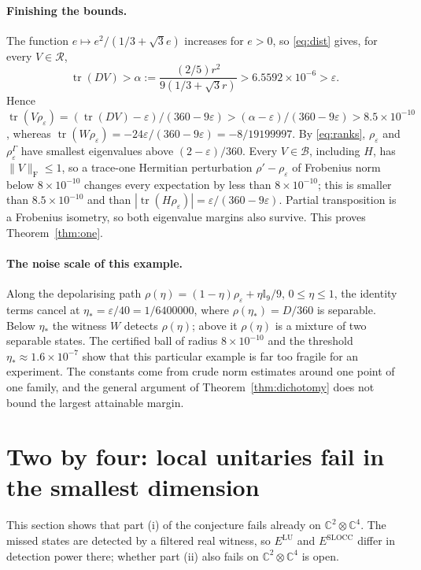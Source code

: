 \documentclass[11pt,a4paper]{article}
\theoremstyle{definition}\newtheorem{definition}[theorem]{Definition}\newtheorem*{conj}{Conjecture 9 of Shen, Chen and Bian}\newtheorem{remark}[theorem]{Remark}
\newcommand{\tr}{\operatorname{tr}}\newcommand{\im}{\operatorname{Im}}\newcommand{\adj}{\operatorname{adj}}\newcommand{\id}{\mathbb I}
\newcommand{\eps}{\varepsilon}\newcommand{\ket}[1]{\lvert #1\rangle}\newcommand{\bra}[1]{\langle #1\rvert}\newcommand{\F}{\mathrm F}\newcommand{\op}{\mathrm{op}}\newcommand{\C}{\mathbb C}
\newcommand{\cB}{\mathcal B}\newcommand{\cR}{\mathcal R}\newcommand{\vecm}{\mathrm{vec}}
\begin{document}
\paragraph{Finishing the bounds.}
The function $e\mapsto e^2/(1/3+\sqrt3 e)$ increases for $e>0$, so \eqref{eq:dist} gives, for every $V\in\cR$,
\[
 \tr(DV)>\alpha:=\frac{(2/5)r^2}{9(1/3+\sqrt3 r)}
 >6.5592\times10^{-6}>\eps .
\]
Hence $\tr(V\rho_\eps)=(\tr(DV)-\eps)/(360-9\eps)>(\alpha-\eps)/(360-9\eps)>8.5\times10^{-10}$, whereas $\tr(W\rho_\eps)=-24\eps/(360-9\eps)=-8/19199997$. By \eqref{eq:ranks}, $\rho_\eps$ and $\rho_\eps^\Gamma$ have smallest eigenvalues above $(2-\eps)/360$. Every $V\in\cB$, including $H$, has $\|V\|_\F\leq1$, so a trace-one Hermitian perturbation $\rho'-\rho_\eps$ of Frobenius norm below $8\times10^{-10}$ changes every expectation by less than $8\times10^{-10}$; this is smaller than $8.5\times10^{-10}$ and than $|\tr(H\rho_\eps)|=\eps/(360-9\eps)$. Partial transposition is a Frobenius isometry, so both eigenvalue margins also survive. This proves Theorem~\ref{thm:one}.

\paragraph{The noise scale of this example.}
Along the depolarising path $\rho(\eta)=(1-\eta)\rho_\eps+\eta\id_9/9$, $0\leq\eta\leq1$, the identity terms cancel at $\eta_*=\eps/40=1/6400000$, where $\rho(\eta_*)=D/360$ is separable. Below $\eta_*$ the witness $W$ detects $\rho(\eta)$; above it $\rho(\eta)$ is a mixture of two separable states. The certified ball of radius $8\times10^{-10}$ and the threshold $\eta_*\approx1.6\times10^{-7}$ show that this particular example is far too fragile for an experiment. The constants come from crude norm estimates around one point of one family, and the general argument of Theorem~\ref{thm:dichotomy} does not bound the largest attainable margin.

\section{Two by four: local unitaries fail in the smallest dimension}\label{sec:2x4}
This section shows that part (i) of the conjecture fails already on $\C^2\otimes\C^4$. The missed states are detected by a filtered real witness, so $E^{\mathrm{LU}}$ and $E^{\mathrm{SLOCC}}$ differ in detection power there; whether part (ii) also fails on $\C^2\otimes\C^4$ is open.
\end{document}
